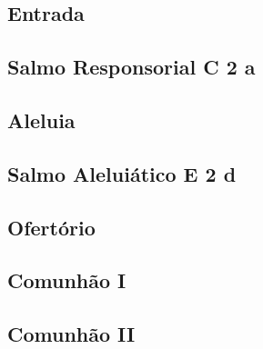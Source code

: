 
\subsection{Entrada}\label{subsection:tempus-nativitatis/sanctae-dei-genetricis-mariae/introitus}

\AllowPageFlush

\subsection[Salmo Responsorial]{Salmo Responsorial \textmd{C 2 a}}\label{subsection:tempus-nativitatis/sanctae-dei-genetricis-mariae/psalmus-responsorius}

\AllowPageFlush

\subsection{Aleluia}\label{subsection:tempus-nativitatis/sanctae-dei-genetricis-mariae/alleluia}

\AllowPageFlush

\subsection[Salmo Aleluiático]{Salmo Aleluiático \textmd{E 2 d}}\label{subsection:tempus-nativitatis/sanctae-dei-genetricis-mariae/psalmus-alleluiaticus}

\AllowPageFlush

\subsection{Ofertório}\label{subsection:tempus-nativitatis/sanctae-dei-genetricis-mariae/offertorium}

\AllowPageFlush

\subsection{Comunhão I}\label{subsection:tempus-nativitatis/sanctae-dei-genetricis-mariae/communio-1}

\AllowPageFlush

\subsection{Comunhão II}\label{subsection:tempus-nativitatis/sanctae-dei-genetricis-mariae/communio-2}
